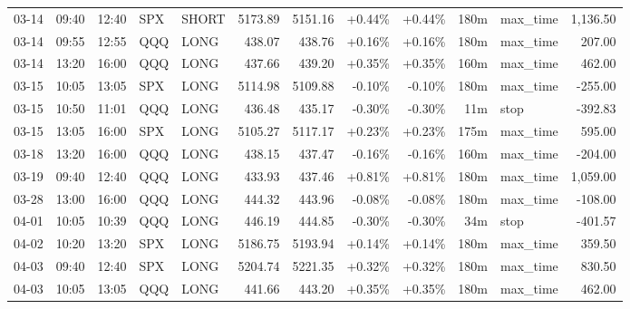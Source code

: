 \documentclass[11pt,a4paper,twoside]{article}
\begin{document}
\begin{center}
\begin{longtable}{>{\color{txtmain}}l l l l l r r r r r >{\color{txtmain}}l r}
03-14 & 09:40 & 12:40 & SPX & SHORT & 5173.89 & 5151.16 & \textcolor{wingreen}{+0.44\%} & \textcolor{wingreen}{+0.44\%} & 180m & max\_time & \textcolor{wingreen}{1,136.50} \\
03-14 & 09:55 & 12:55 & QQQ & LONG & 438.07 & 438.76 & \textcolor{wingreen}{+0.16\%} & \textcolor{wingreen}{+0.16\%} & 180m & max\_time & \textcolor{wingreen}{207.00} \\
03-14 & 13:20 & 16:00 & QQQ & LONG & 437.66 & 439.20 & \textcolor{wingreen}{+0.35\%} & \textcolor{wingreen}{+0.35\%} & 160m & max\_time & \textcolor{wingreen}{462.00} \\
03-15 & 10:05 & 13:05 & SPX & LONG & 5114.98 & 5109.88 & \textcolor{lossred}{-0.10\%} & \textcolor{lossred}{-0.10\%} & 180m & max\_time & \textcolor{lossred}{-255.00} \\
03-15 & 10:50 & 11:01 & QQQ & LONG & 436.48 & 435.17 & \textcolor{lossred}{-0.30\%} & \textcolor{lossred}{-0.30\%} & 11m & stop & \textcolor{lossred}{-392.83} \\
03-15 & 13:05 & 16:00 & SPX & LONG & 5105.27 & 5117.17 & \textcolor{wingreen}{+0.23\%} & \textcolor{wingreen}{+0.23\%} & 175m & max\_time & \textcolor{wingreen}{595.00} \\
03-18 & 13:20 & 16:00 & QQQ & LONG & 438.15 & 437.47 & \textcolor{lossred}{-0.16\%} & \textcolor{lossred}{-0.16\%} & 160m & max\_time & \textcolor{lossred}{-204.00} \\
03-19 & 09:40 & 12:40 & QQQ & LONG & 433.93 & 437.46 & \textcolor{wingreen}{+0.81\%} & \textcolor{wingreen}{+0.81\%} & 180m & max\_time & \textcolor{wingreen}{1,059.00} \\
03-28 & 13:00 & 16:00 & QQQ & LONG & 444.32 & 443.96 & \textcolor{lossred}{-0.08\%} & \textcolor{lossred}{-0.08\%} & 180m & max\_time & \textcolor{lossred}{-108.00} \\
04-01 & 10:05 & 10:39 & QQQ & LONG & 446.19 & 444.85 & \textcolor{lossred}{-0.30\%} & \textcolor{lossred}{-0.30\%} & 34m & stop & \textcolor{lossred}{-401.57} \\
04-02 & 10:20 & 13:20 & SPX & LONG & 5186.75 & 5193.94 & \textcolor{wingreen}{+0.14\%} & \textcolor{wingreen}{+0.14\%} & 180m & max\_time & \textcolor{wingreen}{359.50} \\
04-03 & 09:40 & 12:40 & SPX & LONG & 5204.74 & 5221.35 & \textcolor{wingreen}{+0.32\%} & \textcolor{wingreen}{+0.32\%} & 180m & max\_time & \textcolor{wingreen}{830.50} \\
04-03 & 10:05 & 13:05 & QQQ & LONG & 441.66 & 443.20 & \textcolor{wingreen}{+0.35\%} & \textcolor{wingreen}{+0.35\%} & 180m & max\_time & \textcolor{wingreen}{462.00} \\

\end{longtable}
\end{center}
\end{document}
